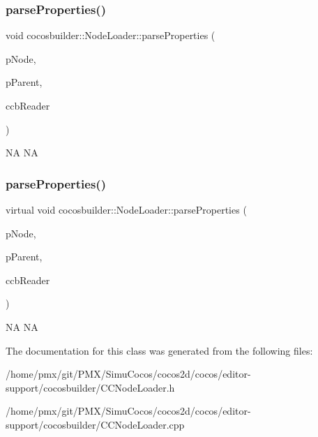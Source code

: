 \subsubsection{\texorpdfstring{parse\+Properties()}{parseProperties()}\hspace{0.1cm}{\footnotesize\ttfamily [1/2]}}
{\footnotesize\ttfamily void cocosbuilder\+::\+Node\+Loader\+::parse\+Properties (\begin{DoxyParamCaption}\item[{cocos2d\+::\+Node $\ast$}]{p\+Node,  }\item[{cocos2d\+::\+Node $\ast$}]{p\+Parent,  }\item[{\hyperlink{classcocosbuilder_1_1CCBReader}{C\+C\+B\+Reader} $\ast$}]{ccb\+Reader }\end{DoxyParamCaption})\hspace{0.3cm}{\ttfamily [virtual]}}

NA  NA \mbox{\label{classcocosbuilder_1_1NodeLoader_a3747dfe5b2d1459673c7a6fb6d51091e}} 
\subsubsection{\texorpdfstring{parse\+Properties()}{parseProperties()}\hspace{0.1cm}{\footnotesize\ttfamily [2/2]}}
{\footnotesize\ttfamily virtual void cocosbuilder\+::\+Node\+Loader\+::parse\+Properties (\begin{DoxyParamCaption}\item[{cocos2d\+::\+Node $\ast$}]{p\+Node,  }\item[{cocos2d\+::\+Node $\ast$}]{p\+Parent,  }\item[{\hyperlink{classcocosbuilder_1_1CCBReader}{C\+C\+B\+Reader} $\ast$}]{ccb\+Reader }\end{DoxyParamCaption})\hspace{0.3cm}{\ttfamily [virtual]}}

NA  NA 

The documentation for this class was generated from the following files\+:\begin{DoxyCompactItemize}
\item 
/home/pmx/git/\+P\+M\+X/\+Simu\+Cocos/cocos2d/cocos/editor-\/support/cocosbuilder/C\+C\+Node\+Loader.\+h\item 
/home/pmx/git/\+P\+M\+X/\+Simu\+Cocos/cocos2d/cocos/editor-\/support/cocosbuilder/C\+C\+Node\+Loader.\+cpp\end{DoxyCompactItemize}
